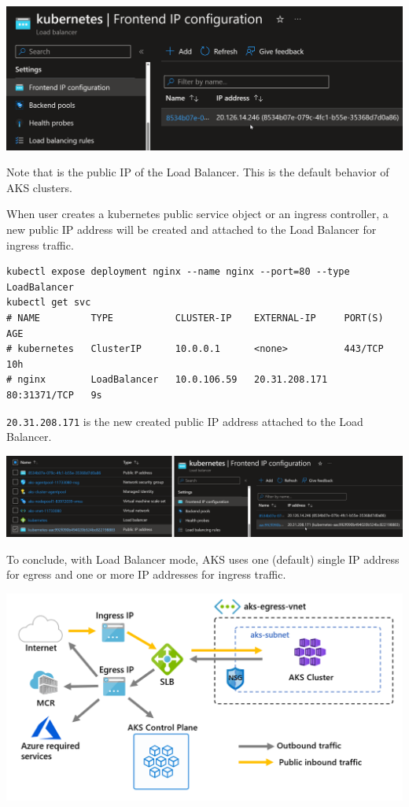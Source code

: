 \documentclass[
]{article}
\newcommand{\passthrough}[1]{#1}
\begin{document}
\includegraphics{images/65_aks_egress_lb_natgw_udr__lb-pip.png}

Note that is the public IP of the Load Balancer. This is the default
behavior of AKS clusters.

When user creates a kubernetes public service object or an ingress
controller, a new public IP address will be created and attached to the
Load Balancer for ingress traffic.

\begin{lstlisting}
kubectl expose deployment nginx --name nginx --port=80 --type LoadBalancer 
kubectl get svc
# NAME         TYPE           CLUSTER-IP    EXTERNAL-IP     PORT(S)        AGE
# kubernetes   ClusterIP      10.0.0.1      <none>          443/TCP        10h
# nginx        LoadBalancer   10.0.106.59   20.31.208.171   80:31371/TCP   9s
\end{lstlisting}

\passthrough{\lstinline!20.31.208.171!} is the new created public IP
address attached to the Load Balancer.

\includegraphics{images/65_aks_egress_lb_natgw_udr__lb-pip-service.png}

To conclude, with Load Balancer mode, AKS uses one (default) single IP
address for egress and one or more IP addresses for ingress traffic.

\includegraphics{images/65_aks_egress_lb_natgw_udr__lb-traffic.png}
\end{document}
